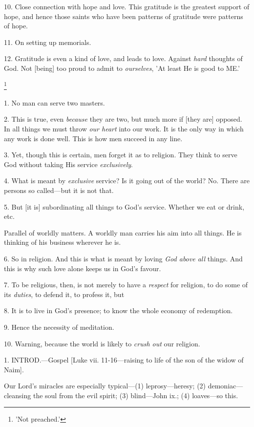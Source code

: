 10. Close connection with hope and love. This
gratitude is the greatest support of hope, and hence those saints who
have been patterns of gratitude were patterns of hope.

11. On setting up memorials.

12. Gratitude is even a kind of love, and leads
to love. Against \emph{hard} thoughts of God. Not [being] too proud to
admit to \emph{ourselves}, 'At least He is good to ME.'


\footnote{'Not preached.'}

1. No man can serve two masters.

2. This is true, even \emph{because} they are
two, but much more if [they are] opposed. In all things we must throw \emph{our
heart} into our work. It is the only way in which any work is done
well. This is how men succeed in any line.

3. Yet, though this is certain, men forget it as
to religion. They think to serve God without taking His service \emph{exclusively}.

4. What is meant by \emph{exclusive} service? Is
it going out of the world? No. There are persons so called—but it is
not that.

5. But [it is] subordinating all things to God's
service. Whether we eat or drink, etc.

Parallel of worldly matters. A worldly man
carries his aim into all things. He is thinking of his business
wherever he is.

6. So in religion. And this is what is meant by
loving \emph{God above all} things. And this is why such love alone
keeps us in God's favour.

7. To be religious, then, is not merely to have a
\emph{respect} for religion, to do some of its \emph{duties}, to
defend it, to profess it, but

8. It is to live in God's presence; to know the
whole economy of redemption.

9. Hence the necessity of meditation.

10. Warning, because the world is likely to \emph{crush
out} our religion.


1. INTROD.—Gospel
[Luke vii. 11-16—raising to life of the son of the widow of Naim].

Our Lord's miracles are especially typical—(1)
leprosy—heresy; (2) demoniac—cleansing the soul from the evil
spirit; (3) blind—John ix.; (4) loaves—so this.

